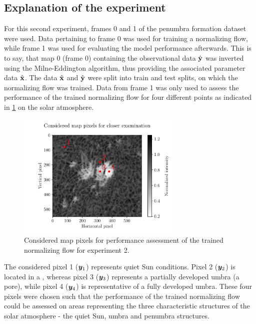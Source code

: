 \documentclass[a4paper,11pt]{report}
\def\lk#1{{\color{black}{#1}}}
\begin{document}
\subsection{Explanation of the experiment}
For this second experiment, frames 0 and 1 of the penumbra formation dataset were used. Data pertaining to frame 0 was used for training a normalizing flow, while frame 1 was used for evaluating the model performance afterwards. This is to say, that map 0 (frame 0) containing the observational data $\hat{\boldsymbol{\mathbf{y}}}$ was inverted using the Milne-Eddington algorithm, thus providing the associated parameter data $\hat{\boldsymbol{\mathbf{x}}}$. The data $\hat{\boldsymbol{\mathbf{x}}}$ and $\hat{\boldsymbol{\mathbf{y}}}$ were split into train and test splits, on which the normalizing flow was trained. Data from frame 1 was only used to assess the performance of the trained normalizing flow for four different points as indicated in \cref{fig:nf-milne-eddington-example-6-considered-map-pixels-nflows-piecewisequadratic} on the solar atmosphere.
\begin{figure}[h!]
\centering
\includegraphics[width=8cm]{figures/nf-milne-eddington-example-6-considered-map-pixels-nflows-piecewisequadratic.pdf}
\caption{Considered map pixels for performance assessment of the trained normalizing flow for experiment 2.}
\label{fig:nf-milne-eddington-example-6-considered-map-pixels-nflows-piecewisequadratic}
\end{figure}
The considered pixel 1 ($\bm{y}_1$) represents quiet Sun conditions. Pixel 2 ($\bm{y}_2$) is located in a \lk{penumbra-developing area}, whereas pixel 3 ($\bm{y}_3$) represents a partially developed umbra (a pore), while pixel 4 ($\bm{y}_4$) is representative of a fully developed umbra. These four pixels were chosen such that the performance of the trained normalizing flow could be assessed on areas representing the three characteristic structures of the solar atmosphere - the quiet Sun, umbra and penumbra structures.
\end{document}
